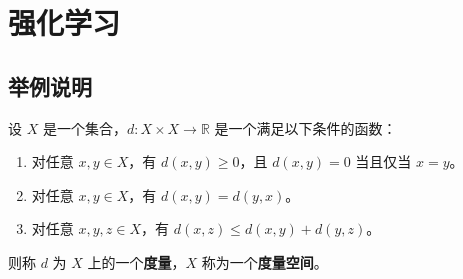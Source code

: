 \documentclass[12pt, a4paper, oneside, UTF8]{ctexbook}
\begin{document}
	\else
	\fi
	\chapter{强化学习}
	
	\section{举例说明}
	
	\begin{defn}
		设 $X$ 是一个集合，$d: X \times X \to \mathbb{R}$ 是一个满足以下条件的函数：
		\begin{enumerate}
			\item 对任意 $x, y \in X$，有 $d(x, y) \geq 0$，且 $d(x, y) = 0$ 当且仅当 $x = y$。
			\item 对任意 $x, y \in X$，有 $d(x, y) = d(y, x)$。
			\item 对任意 $x, y, z \in X$，有 $d(x, z) \leq d(x, y) + d(y, z)$。
		\end{enumerate}
		则称 $d$ 为 $X$ 上的一个\textbf{度量}，$X$ 称为一个\textbf{度量空间}。
	\end{defn}
	
	\ifx\allfiles\undefined
\end{document}
